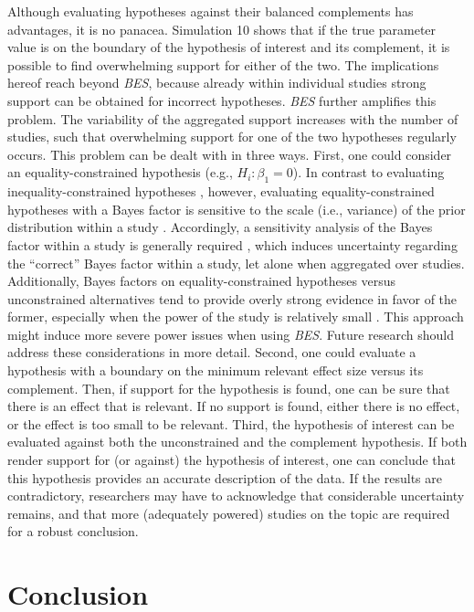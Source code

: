 \documentclass[review, 3p, authoryear]{elsarticle} %
\begin{document}
Although evaluating hypotheses against their balanced complements has advantages, it is no panacea.
Simulation 10 shows that if the true parameter value is on the boundary of the hypothesis of interest and its complement, it is possible to find overwhelming support for either of the two.
The implications hereof reach beyond \emph{BES}, because already within individual studies strong support can be obtained for incorrect hypotheses.
\emph{BES} further amplifies this problem.
The variability of the aggregated support increases with the number of studies, such that overwhelming support for one of the two hypotheses regularly occurs.
This problem can be dealt with in three ways.
First, one could consider an equality-constrained hypothesis (e.g., \(H_i: \beta_1=0\)).
In contrast to evaluating inequality-constrained hypotheses \citep{klugkist_bf_2007}, however, evaluating equality-constrained hypotheses with a Bayes factor is sensitive to the scale (i.e., variance) of the prior distribution within a study \citep{hoijtink_prior_2021, tendeiro_kiers_2019}.
Accordingly, a sensitivity analysis of the Bayes factor within a study is generally required \citep{hoijtink_prior_2021}, which induces uncertainty regarding the ``correct'' Bayes factor within a study, let alone when aggregated over studies.
Additionally, Bayes factors on equality-constrained hypotheses versus unconstrained alternatives tend to provide overly strong evidence in favor of the former, especially when the power of the study is relatively small \citep[e.g.,][]{tendeiro_kiers_2019}.
This approach might induce more severe power issues when using \emph{BES}.
Future research should address these considerations in more detail.
Second, one could evaluate a hypothesis with a boundary on the minimum relevant effect size versus its complement.
Then, if support for the hypothesis is found, one can be sure that there is an effect that is relevant.
If no support is found, either there is no effect, or the effect is too small to be relevant.
Third, the hypothesis of interest can be evaluated against both the unconstrained and the complement hypothesis.
If both render support for (or against) the hypothesis of interest, one can conclude that this hypothesis provides an accurate description of the data.
If the results are contradictory, researchers may have to acknowledge that considerable uncertainty remains, and that more (adequately powered) studies on the topic are required for a robust conclusion.

\hypertarget{conclusion}{%
\section{Conclusion}\label{conclusion}}
\end{document}
